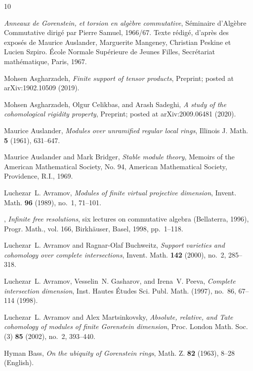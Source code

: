 \documentclass[11pt]{amsart}
\theoremstyle{definition}
\theoremstyle{definition}
\numberwithin{equation}{section}
\begin{document}
\begin{thebibliography}{10}

\emph{Anneaux de {G}orenstein, et torsion en alg\`ebre commutative},
  S\'eminaire d'Alg\`ebre Commutative dirig\'e par Pierre Samuel, 1966/67.
  Texte r\'edig\'e, d'apr\`es des expos\'es de Maurice Auslander, Marguerite
  Mangeney, Christian Peskine et Lucien Szpiro. \'Ecole Normale Sup\'erieure de
  Jeunes Filles, Secr\'etariat math\'ematique, Paris, 1967.

Mohsen Asgharzadeh, \emph{Finite support of tensor products}, Preprint; posted
  at arXiv:1902.10509 (2019).

Mohsen Asgharzadeh, Olgur Celikbas, and Arash Sadeghi, \emph{A study of the
  cohomological rigidity property}, Preprint; posted at arXiv:2009.06481
  (2020).

Maurice Auslander, \emph{Modules over unramified regular local rings}, Illinois
  J. Math. \textbf{5} (1961), 631--647.

Maurice Auslander and Mark Bridger, \emph{Stable module theory}, Memoirs of the
  American Mathematical Society, No. 94, American Mathematical Society,
  Providence, R.I., 1969.

Luchezar~L. Avramov, \emph{Modules of finite virtual projective dimension},
  Invent. Math. \textbf{96} (1989), no.~1, 71--101.

\bysame, \emph{Infinite free resolutions}, six lectures on commutative algebra
  ({B}ellaterra, 1996), Progr. Math., vol. 166, Birkh\"auser, Basel, 1998,
  pp.~1--118.

Luchezar~L. Avramov and Ragnar-Olaf Buchweitz, \emph{Support varieties and
  cohomology over complete intersections}, Invent. Math. \textbf{142} (2000),
  no.~2, 285--318.

Luchezar~L. Avramov, Vesselin~N. Gasharov, and Irena~V. Peeva, \emph{Complete
  intersection dimension}, Inst. Hautes \'Etudes Sci. Publ. Math. (1997),
  no.~86, 67--114 (1998).

Luchezar~L. Avramov and Alex Martsinkovsky, \emph{Absolute, relative, and
  {T}ate cohomology of modules of finite {G}orenstein dimension}, Proc. London
  Math. Soc. (3) \textbf{85} (2002), no.~2, 393--440.

Hyman Bass, \emph{On the ubiquity of {Gorenstein} rings}, Math. Z. \textbf{82}
  (1963), 8--28 (English).


\end{thebibliography}
\end{document}
